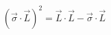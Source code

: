 \begin{equation}
(\vec{\sigma} \cdot \vec{L})^{2} = \vec{L} \cdot \vec{L}-\vec{\sigma} \cdot \vec{L}
\end{equation}

